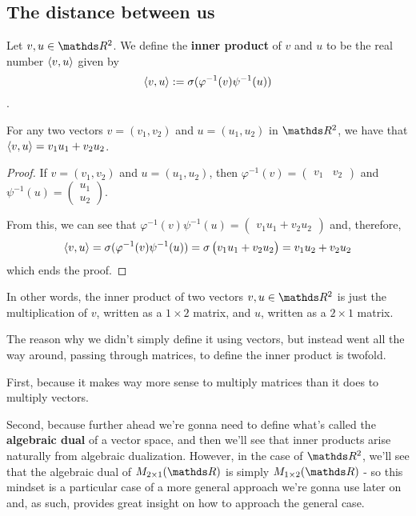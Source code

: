 \newpage
\subsection{The distance between us}

\begin{df}
	Let $v,u\in \R^2$. We define the \textbf{inner product} of $v$ and $u$ to be the real number $\langle v,u\rangle$ given by
	\[\langle v,u\rangle:=\sigma(\varphi^{-1}(v)\psi^{-1}(u))\].
\end{df}

\begin{prop}
	For any two vectors $v=(v_1,v_2)$ and $u=(u_1,u_2)$ in $\R^2$, we have that $\langle v,u\rangle=v_1u_1+v_2u_2$.
\end{prop}
\begin{proof}
	If $v=(v_1,v_2)$ and $u=(u_1,u_2)$, then $\varphi^{-1}(v)=\begin{pmatrix}
	v_1&v_2
	\end{pmatrix}$ and $\psi^{-1}(u)=\begin{pmatrix}
	u_1\\u_2
	\end{pmatrix}$.
	
	From this, we can see that $\varphi^{-1}(v)\psi^{-1}(u)=\begin{pmatrix}
	v_1u_1+v_2u_2
	\end{pmatrix}$ and, therefore,
	\[\langle v,u\rangle=\sigma(\varphi^{-1}(v)\psi^{-1}(u))=\sigma\begin{pmatrix}
	v_1u_1+v_2u_2
	\end{pmatrix}=v_1u_2+v_2u_2\]which ends the proof.
\end{proof}

In other words, the inner product of two vectors $v,u\in \R^2$ is just the multiplication of $v$, written as a $1\times 2$ matrix, and $u$, written as a $2\times 1$ matrix.

\bigskip
The reason why we didn't simply define it using vectors, but instead went all the way around, passing through matrices, to define the inner product is twofold.

First, because it makes way more sense to multiply matrices than it does to multiply vectors.

Second, because further ahead we're gonna need to define what's called the \textbf{algebraic dual} of a vector space, and then we'll see that inner products arise naturally from algebraic dualization. However, in the case of $\R^2$, we'll see that the algebraic dual of $M_{2\times 1}(\R)$ is simply $M_{1\times 2}(\R)$ - so this mindset is a particular case of a more general approach we're gonna use later on and, as such, provides great insight on how to approach the general case.


